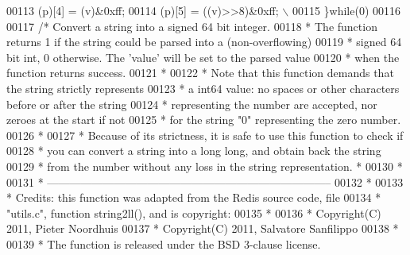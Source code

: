 \begin{DoxyCode}
00113     \textcolor{preprocessor}{(}\textcolor{preprocessor}{p}\textcolor{preprocessor}{)}\textcolor{preprocessor}{[}4\textcolor{preprocessor}{]} \textcolor{preprocessor}{=} \textcolor{preprocessor}{(}\textcolor{preprocessor}{v}\textcolor{preprocessor}{)}\textcolor{preprocessor}{&}0xff\textcolor{preprocessor}{;}
00114     \textcolor{preprocessor}{(}\textcolor{preprocessor}{p}\textcolor{preprocessor}{)}\textcolor{preprocessor}{[}5\textcolor{preprocessor}{]} \textcolor{preprocessor}{=} \textcolor{preprocessor}{(}\textcolor{preprocessor}{(}\textcolor{preprocessor}{v}\textcolor{preprocessor}{)}\textcolor{preprocessor}{>>}8\textcolor{preprocessor}{)}\textcolor{preprocessor}{&}0xff\textcolor{preprocessor}{;} \textcolor{preprocessor}{\(\backslash\)}
00115 \textcolor{preprocessor}{\}}\textcolor{keywordflow}{while}\textcolor{preprocessor}{(}0\textcolor{preprocessor}{)}
00116 
00117 \textcolor{comment}{/* Convert a string into a signed 64 bit integer.}
00118 \textcolor{comment}{ * The function returns 1 if the string could be parsed into a (non-overflowing)}
00119 \textcolor{comment}{ * signed 64 bit int, 0 otherwise. The 'value' will be set to the parsed value}
00120 \textcolor{comment}{ * when the function returns success.}
00121 \textcolor{comment}{ *}
00122 \textcolor{comment}{ * Note that this function demands that the string strictly represents}
00123 \textcolor{comment}{ * a int64 value: no spaces or other characters before or after the string}
00124 \textcolor{comment}{ * representing the number are accepted, nor zeroes at the start if not}
00125 \textcolor{comment}{ * for the string "0" representing the zero number.}
00126 \textcolor{comment}{ *}
00127 \textcolor{comment}{ * Because of its strictness, it is safe to use this function to check if}
00128 \textcolor{comment}{ * you can convert a string into a long long, and obtain back the string}
00129 \textcolor{comment}{ * from the number without any loss in the string representation. *}
00130 \textcolor{comment}{ *}
00131 \textcolor{comment}{ * -----------------------------------------------------------------------------}
00132 \textcolor{comment}{ *}
00133 \textcolor{comment}{ * Credits: this function was adapted from the Redis source code, file}
00134 \textcolor{comment}{ * "utils.c", function string2ll(), and is copyright:}
00135 \textcolor{comment}{ *}
00136 \textcolor{comment}{ * Copyright(C) 2011, Pieter Noordhuis}
00137 \textcolor{comment}{ * Copyright(C) 2011, Salvatore Sanfilippo}
00138 \textcolor{comment}{ *}
00139 \textcolor{comment}{ * The function is released under the BSD 3-clause license.}

\end{DoxyCode}
